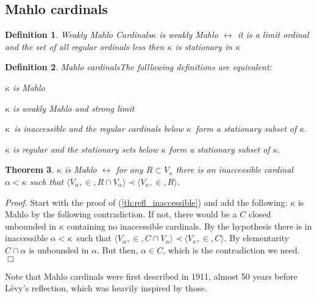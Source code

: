 \documentclass[12pt,a4paper]{article}
\newtheorem{theorem}{Theorem}[section]
\newtheorem{definition}[theorem]{Definition}
\newenvironment{proof}
{\noindent \textit{Proof.}}
{\hspace*{\fill} $\Box$}
\renewcommand{\iff}{\leftrightarrow}
\newcommand{\bce}{\begin{compactenum}}
\newcommand{\ece}{\end{compactenum}}
\begin{document}
%
%
\subsection{Mahlo cardinals}
\begin{definition}{Weakly Mahlo Cardinals}\label{def:weakly_mahlo}
$\kappa$ is \emph{weakly Mahlo} $\iff$ it is a limit ordinal and the set of all regular ordinals less then $\kappa$ is stationary in $\kappa$
\end{definition}

\begin{definition}{Mahlo cardinals}\label{def:mahlo}
The folllowing definitions are equivalent:
\bce[(i)]
\item $\kappa$ is Mahlo
\item $\kappa$ is weakly Mahlo and strong limit
\item $\kappa$ is inaccessible and the regular cardinals below $\kappa$ form a stationary subset of $\kappa$.
\item $\kappa$ is regular and the stationary sets below $\kappa$ form a stationary subset of $\kappa$.
\ece
\end{definition}

\begin{theorem}\label{th:refl_mahlo}
$\kappa$ is Mahlo $\iff$ for any $R \subset V_\kappa$ there is an inaccessible cardinal $\alpha < \kappa$ such that $\langle V_\alpha, \in, R \cap V_\alpha \rangle \prec \langle V_\kappa, \in, R \rangle$.
\end{theorem}

\begin{proof}
Start with the proof of (\ref{th:refl_inaccessible}) and add the following:\newline
$\kappa$ is Mahlo by the following contradiction. If not, there would be a $C$ closed unbounded in $\kappa$ containing no inaccessible cardinals. By the hypothesis there is in inaccessible $\alpha < \kappa$ such that $\langle V_\alpha, \in, C \cap V_\alpha \rangle \prec \langle V_\kappa, \in, C \rangle$. By elementarity $C \cap \alpha$ is unbounded in $\alpha$. But then, $\alpha \in C$, which is the contradiction we need.
\end{proof}

Note that Mahlo cardinals were first described in 1911, almost 50 years before Lévy's reflection, which was heavily inspired by those. %
\end{document}
